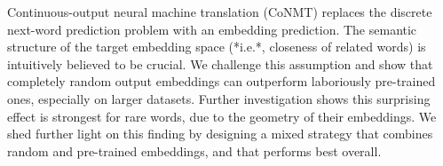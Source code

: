 Continuous-output neural machine translation (CoNMT) replaces the discrete next-word prediction problem with an embedding prediction. The semantic structure of the target embedding space (*i.e.*, closeness of related words) is intuitively believed to be crucial. We challenge this assumption and show that completely random output embeddings can outperform laboriously pre-trained ones, especially on larger datasets. Further investigation shows this surprising effect is strongest for rare words, due to the geometry of their embeddings. We shed further light on this finding by designing a mixed strategy that combines random and pre-trained embeddings, and that performs best overall.